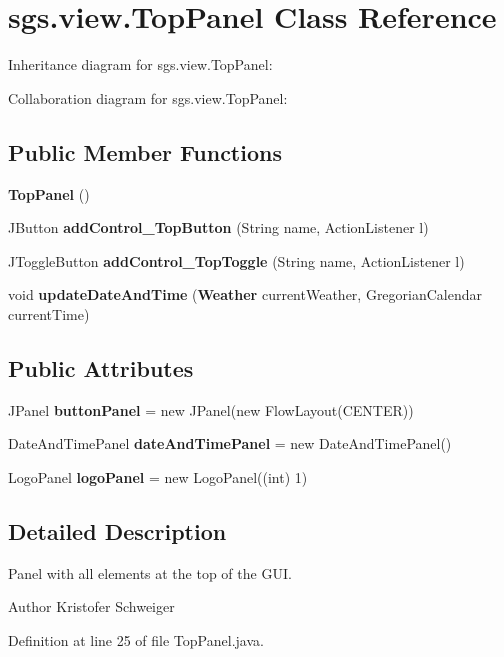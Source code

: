 \section{sgs.\-view.\-Top\-Panel Class Reference}
\label{classsgs_1_1view_1_1_top_panel}


Inheritance diagram for sgs.\-view.\-Top\-Panel\-:


Collaboration diagram for sgs.\-view.\-Top\-Panel\-:
\subsection*{Public Member Functions}
\begin{DoxyCompactItemize}
\item 
{\bf Top\-Panel} ()
\item 
J\-Button {\bf add\-Control\-\_\-\-Top\-Button} (String name, Action\-Listener l)
\item 
J\-Toggle\-Button {\bf add\-Control\-\_\-\-Top\-Toggle} (String name, Action\-Listener l)
\item 
void {\bf update\-Date\-And\-Time} ({\bf Weather} current\-Weather, Gregorian\-Calendar current\-Time)
\end{DoxyCompactItemize}
\subsection*{Public Attributes}
\begin{DoxyCompactItemize}
\item 
J\-Panel {\bf button\-Panel} = new J\-Panel(new Flow\-Layout(C\-E\-N\-T\-E\-R))
\item 
Date\-And\-Time\-Panel {\bf date\-And\-Time\-Panel} = new Date\-And\-Time\-Panel()
\item 
Logo\-Panel {\bf logo\-Panel} = new Logo\-Panel((int) 1)
\end{DoxyCompactItemize}


\subsection{Detailed Description}
Panel with all elements at the top of the G\-U\-I.

\begin{DoxyAuthor}{Author}
Kristofer Schweiger 
\end{DoxyAuthor}


Definition at line 25 of file Top\-Panel.\-java.



